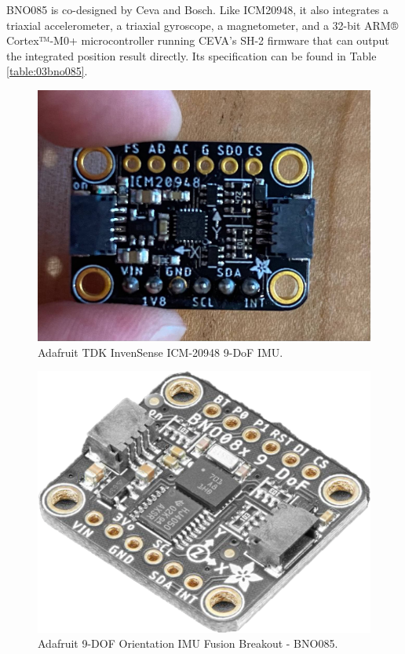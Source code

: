 BNO085 is co-designed by Ceva and Bosch. Like ICM20948, it also integrates a triaxial accelerometer, a triaxial gyroscope, a magnetometer, and a 32-bit ARM® Cortex™-M0+ microcontroller running CEVA's SH-2 firmware that can output the integrated position result directly. Its specification can be found in Table \ref{table:03bno085}.

\begin{figure}[H]
    \centering
    \includegraphics[width=.6\textwidth]{images/03icm20948.jpg}
    \caption{Adafruit TDK InvenSense ICM-20948 9-DoF IMU.}
    \label{fig:03icm20948}
\end{figure}

\begin{figure}[H]
    \centering
    \includegraphics[width=.6\textwidth]{images/03bno085.png}
    \caption{Adafruit 9-DOF Orientation IMU Fusion Breakout - BNO085.}
    \label{fig:03bno085}
\end{figure}


